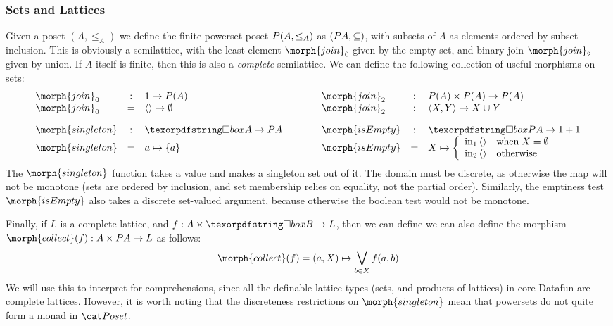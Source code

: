 \subsubsection{Sets and Lattices} Given a poset $(A, \leq_A)$ we
define the finite powerset poset $P (A, \leq_A)$ as
$(P A, \subseteq)$, with subsets of $A$ as elements ordered by
subset inclusion. This is obviously a semilattice, with the least
element $\morph{join}_0$ given by the empty set, and binary join
$\morph{join}_2$ given by union. If $A$ itself is finite, then this is
also a \emph{complete} semilattice.  We can define the following
collection of useful morphisms on sets:
\begin{displaymath}
  \begin{array}{lclclcl}
    \morph{join}_0& : & 1 \to \pfinof(A) & \qquad & \morph{join}_2 & : & \pfinof(A) \times \pfinof(A) \to \pfinof(A) \\
    \morph{join}_0& = & \etuple{} \mapsto \emptyset  &  & \morph{join}_2 & : & \etuple{X, Y} \mapsto X \cup Y \\[1em]
    \morph{singleton} & : & \iso A \to \pfinof{A} & & \morph{isEmpty} & : & \iso \pfinof{A} \to 1 + 1 \\
    \morph{singleton} & = & a \mapsto \esetraw{a}
    & &
    \morph{isEmpty} & = & X \mapsto \left\{ \begin{array}{ll}
                                              \inj 1 {\etuple{}} & \mbox{when}\;X = \emptyset \\
                                              \inj 2 {\etuple{}} & \mbox{otherwise}
                                            \end{array}
                                    \right.
  \end{array}
\end{displaymath}
The $\morph{singleton}$ function takes a value and makes a singleton set out of it. The
domain must be discrete, as otherwise the map will not be monotone (sets are ordered by
inclusion, and set membership relies on equality, not the partial order). Similarly,
the emptiness test $\morph{isEmpty}$ also takes a discrete set-valued argument, because
otherwise the boolean test would not be monotone.

Finally, if $L$ is a complete lattice, and $f : A \times \iso B \to L$, then we can define
we can also define the morphism $\morph{collect}(f) : A \times \pfinof{A} \to L$ as follows:
\begin{displaymath}
 \morph{collect}(f)  = (a, X) \mapsto \bigvee_{b \in X} f(a, b)
\end{displaymath}
We will use this to interpret for-comprehensions, since all the definable lattice
types (sets, and products of lattices) in core Datafun are complete lattices. However,
it is worth noting that the discreteness restrictions on $\morph{singleton}$ mean that
powersets do not quite form a monad in $\Poset$.

